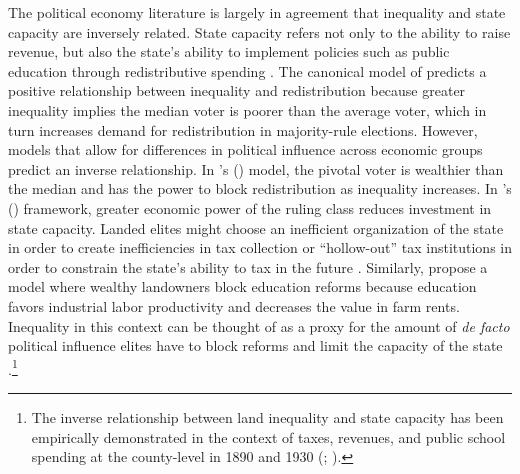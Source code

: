 \documentclass[12pt]{article}
\newcommand{\possessivecite}[1]{\citeauthor{#1}'s (\citeyear{#1})}
\begin{document}
The political economy literature is largely in agreement that inequality and state capacity are inversely related. State capacity refers not only to the ability to raise revenue, but also the state’s ability to implement policies such as public education through redistributive spending \citep{besley2010state}. The canonical model of \citet{meltzer1981rational} predicts a positive relationship between inequality and redistribution because greater inequality implies the median voter is poorer than the average voter, which in turn increases demand for redistribution in majority-rule elections. However, models that allow for differences in political influence across economic groups predict an inverse relationship. In \possessivecite{benabou2000unequal} model, the pivotal voter is wealthier than the median and has the power to block redistribution as inequality increases. In \possessivecite{besley2009origins} framework, greater economic power of the ruling class reduces investment in state capacity. Landed elites might choose an inefficient organization of the state in order to create inefficiencies in tax collection \citep{acemoglu2011emergence} or ``hollow-out'' tax institutions in order to constrain the state's ability to tax in the future \citep{suryanarayan2017hollowing}. Similarly, \citet{galor2009inequality} propose a model where wealthy landowners block education reforms because education favors industrial labor productivity and decreases the value in farm rents. Inequality in this context can be thought of as a proxy for the amount of \emph{de facto} political influence elites have to block reforms and limit the capacity of the state \citep{acemoglu2008persistence}.\footnote{The inverse relationship between land inequality and state capacity has been empirically demonstrated in the context of taxes, revenues, and public school spending at the county-level in 1890 and 1930 (\citep{ramcharan2010inequality}; \citep{vollrath2013inequality}).}
\end{document}
